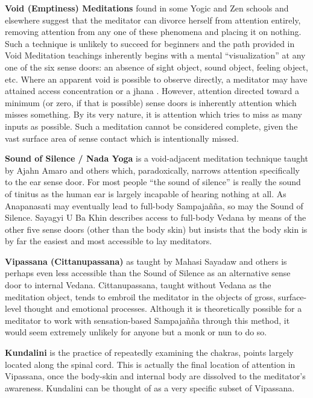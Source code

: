 \documentclass[a4paper, amsfonts, amssymb, amsmath, reprint, showkeys, nofootinbib, twoside]{revtex4-1}
\begin{document}
\textbf{Void (Emptiness) Meditations} found in some Yogic and Zen schools and
elsewhere suggest that the meditator can
divorce herself from attention entirely, removing attention from any one of these
phenomena and placing it on nothing. Such a technique is unlikely to succeed for
beginners and the path provided in Void Meditation teachings inherently begins with a
mental ``visualization'' at any one of the six sense doors: an absence of sight
object, sound object, feeling object, etc. Where an apparent void is possible to
observe directly, a meditator may have attained access concentration  or a jhana . However, attention
directed toward a minimum (or zero, if that is possible) sense doors is inherently
attention which misses something. By its very nature, it is attention which tries to
miss as many inputs as possible. Such a meditation cannot be considered complete,
given the vast surface area of sense contact which is intentionally missed.

\textbf{Sound of Silence / Nada Yoga} is a void-adjacent meditation technique taught
by Ajahn Amaro and others which, paradoxically, narrows attention specifically to the
ear sense door. For most people ``the sound of silence'' is really the sound of
tinitus  as the human ear is largely incapable of
hearing nothing at all. As Anapanasati may eventually lead to full-body Sampajañña,
so may the Sound of Silence. Sayagyi U Ba Khin describes access to full-body Vedana
by means of the other five sense doors (other than the body skin) but insists that
the body skin is by far the easiest and most accessible to lay meditators. 

\textbf{Vipassana (Cittanupassana)}  as taught by
Mahasi Sayadaw and others is perhaps
even less accessible than the Sound of Silence as an alternative sense door to
internal Vedana. Cittanupassana, taught without Vedana as the meditation object,
tends to embroil the meditator in the objects of gross, surface-level thought and
emotional processes. Although it is theoretically possible for a meditator to work
with sensation-based Sampajañña through this method, it would seem extremely unlikely
for anyone but a monk or nun to do so.

\textbf{Kundalini} is the practice of repeatedly examining the chakras, points
largely located along the spinal cord. This is actually the final location of
attention in Vipassana, once the body-skin and internal body are dissolved to the
meditator's awareness. Kundalini can be thought of as a very specific subset of
Vipassana.  
\end{document}
